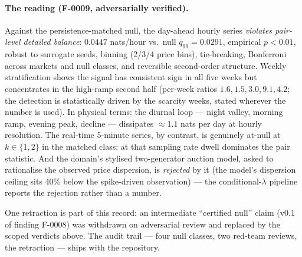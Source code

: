 \paragraph{The reading (F-0009, adversarially verified).} Against the
persistence-matched null, the day-ahead hourly series \emph{violates
pair-level detailed balance}: $0.0447$ nats/hour vs.\ null $q_{99} =
0.0291$, empirical $p < 0.01$, robust to surrogate seeds, binning
(2/3/4 price bins), tie-breaking, Bonferroni across markets and null
classes, and reversible second-order structure. Weekly stratification
shows the signal has consistent sign in all five weeks but concentrates in
the high-ramp second half (per-week ratios $1.6, 1.5, 3.0, 9.1, 4.2$; the
detection is statistically driven by the scarcity weeks, stated wherever
the number is used). In physical terms: the diurnal loop --- night valley,
morning ramp, evening peak, decline --- dissipates $\approx 1.1$ nats per
day at hourly resolution. The real-time 5-minute series, by contrast, is
genuinely at-null at $k \in \{1,2\}$ in the matched class: at that sampling
rate dwell dominates the pair statistic. And the domain's stylised
two-generator auction model, asked to rationalise the observed price
dispersion, is \emph{rejected} by it (the model's dispersion ceiling sits
40\% below the spike-driven observation) --- the conditional-$\lambda$
pipeline reports the rejection rather than a number.

One retraction is part of this record: an intermediate ``certified null''
claim (v0.1 of finding F-0008) was withdrawn on adversarial review and
replaced by the scoped verdicts above. The audit trail --- four null
classes, two red-team reviews, the retraction --- ships with the
repository.
